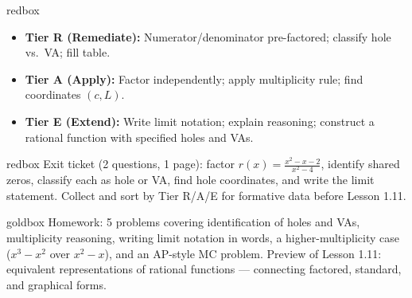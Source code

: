 \documentclass[10pt]{article}
\begin{document}
\begin{skillbox}{redbox}
\begin{itemize}[leftmargin=1.2em,itemsep=2pt,topsep=0pt]
  \item \textbf{Tier R (Remediate):} Numerator/denominator pre-factored; classify hole vs.\ VA; fill table.
  \item \textbf{Tier A (Apply):} Factor independently; apply multiplicity rule; find coordinates $(c, L)$.
  \item \textbf{Tier E (Extend):} Write limit notation; explain reasoning; construct a rational function
        with specified holes and VAs.
\end{itemize}
\end{skillbox}

\begin{skillbox}{redbox}
Exit ticket (2 questions, 1 page): factor $r(x) = \frac{x^2-x-2}{x^2-4}$, identify shared zeros,
classify each as hole or VA, find hole coordinates, and write the limit statement.
Collect and sort by Tier R/A/E for formative data before Lesson 1.11.
\end{skillbox}

\begin{skillbox}{goldbox}
Homework: 5 problems covering identification of holes and VAs, multiplicity reasoning,
writing limit notation in words, a higher-multiplicity case ($x^3 - x^2$ over $x^2 - x$),
and an AP-style MC problem.
Preview of Lesson 1.11: equivalent representations of rational functions --- connecting
factored, standard, and graphical forms.
\end{skillbox}
\end{document}
